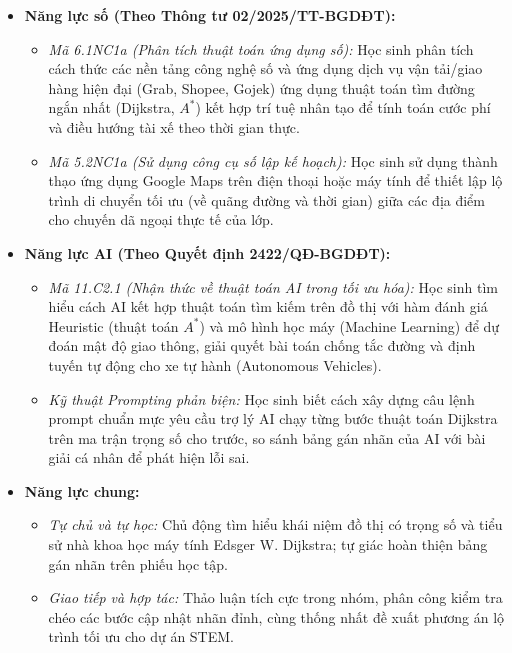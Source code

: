 \documentclass[12pt, a4paper]{article}
\begin{document}
\begin{itemize}[leftmargin=1.2cm]
    \item \textbf{Năng lực số (Theo Thông tư 02/2025/TT-BGDĐT):}
    \begin{itemize}[leftmargin=0.6cm]
        \item \textit{Mã 6.1NC1a (Phân tích thuật toán ứng dụng số):} Học sinh phân tích cách thức các nền tảng công nghệ số và ứng dụng dịch vụ vận tải/giao hàng hiện đại (Grab, Shopee, Gojek) ứng dụng thuật toán tìm đường ngắn nhất (Dijkstra, $A^*$) kết hợp trí tuệ nhân tạo để tính toán cước phí và điều hướng tài xế theo thời gian thực.
        \item \textit{Mã 5.2NC1a (Sử dụng công cụ số lập kế hoạch):} Học sinh sử dụng thành thạo ứng dụng Google Maps trên điện thoại hoặc máy tính để thiết lập lộ trình di chuyển tối ưu (về quãng đường và thời gian) giữa các địa điểm cho chuyến dã ngoại thực tế của lớp.
    \end{itemize}

    \item \textbf{Năng lực AI (Theo Quyết định 2422/QĐ-BGDĐT):}
    \begin{itemize}[leftmargin=0.6cm]
        \item \textit{Mã 11.C2.1 (Nhận thức về thuật toán AI trong tối ưu hóa):} Học sinh tìm hiểu cách AI kết hợp thuật toán tìm kiếm trên đồ thị với hàm đánh giá Heuristic (thuật toán $A^*$) và mô hình học máy (Machine Learning) để dự đoán mật độ giao thông, giải quyết bài toán chống tắc đường và định tuyến tự động cho xe tự hành (Autonomous Vehicles).
        \item \textit{Kỹ thuật Prompting phản biện:} Học sinh biết cách xây dựng câu lệnh prompt chuẩn mực yêu cầu trợ lý AI chạy từng bước thuật toán Dijkstra trên ma trận trọng số cho trước, so sánh bảng gán nhãn của AI với bài giải cá nhân để phát hiện lỗi sai.
    \end{itemize}

    \item \textbf{Năng lực chung:}
    \begin{itemize}[leftmargin=0.6cm]
        \item \textit{Tự chủ và tự học:} Chủ động tìm hiểu khái niệm đồ thị có trọng số và tiểu sử nhà khoa học máy tính Edsger W. Dijkstra; tự giác hoàn thiện bảng gán nhãn trên phiếu học tập.
        \item \textit{Giao tiếp và hợp tác:} Thảo luận tích cực trong nhóm, phân công kiểm tra chéo các bước cập nhật nhãn đỉnh, cùng thống nhất đề xuất phương án lộ trình tối ưu cho dự án STEM.
    \end{itemize}
\end{itemize}
\end{document}

